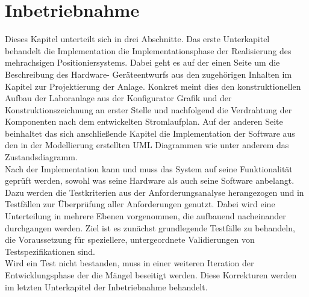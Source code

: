 \documentclass[../../Bachelorarbeit.tex]{subfiles}
\begin{document}
\section{Inbetriebnahme}
Dieses Kapitel unterteilt sich in drei Abschnitte. Das erste Unterkapitel behandelt die Implementation \bzw die Implementationsphase der Realisierung des mehrachsigen Positioniersystems. Dabei geht es auf der einen Seite um die Beschreibung des Hardware- \bzw Geräteentwurfs aus den zugehörigen Inhalten im Kapitel zur Projektierung der Anlage. Konkret meint dies den konstruktionellen Aufbau der Laboranlage aus der Konfigurator Grafik und der Konstruktionszeichnung an erster Stelle und nachfolgend die Verdrahtung der Komponenten nach dem entwickelten Stromlaufplan. Auf der anderen Seite beinhaltet das sich anschließende Kapitel die Implementation der Software aus den in der Modellierung erstellten UML Diagrammen wie unter anderem das Zustandsdiagramm.\\
Nach der Implementation kann und muss das System auf seine Funktionalität geprüft werden, sowohl was seine Hardware als auch seine Software anbelangt. Dazu werden die Testkriterien aus der Anforderungsanalyse herangezogen und in Testfällen zur Überprüfung aller Anforderungen genutzt. Dabei wird eine Unterteilung in mehrere Ebenen vorgenommen, die aufbauend nacheinander durchgangen werden. Ziel ist es zunächst grundlegende Testfälle zu behandeln, die Voraussetzung für speziellere, untergeordnete Validierungen von Testspezifikationen sind. \\
Wird ein Test nicht bestanden, muss in einer weiteren Iteration der Entwicklungsphase der \bzw die Mängel beseitigt werden. Diese Korrekturen werden im letzten Unterkapitel der Inbetriebnahme behandelt. 
\end{document}
